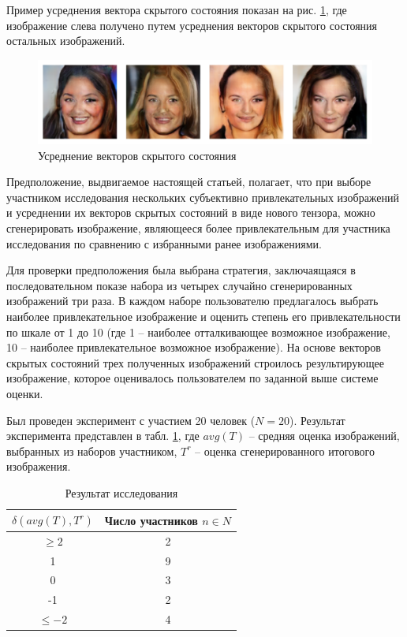 \documentclass[60x84/16,8pt]{ittmm}
\begin{document}
Пример усреднения вектора скрытого состояния показан на рис. \ref{fig:interpolation}, где изображение слева
получено путем усреднения векторов скрытого состояния остальных изображений.

\begin{figure}
  \centering
  \includegraphics[width=0.8\linewidth]{interpolation}
  \caption{Усреднение векторов скрытого состояния}
  \label{fig:interpolation}
\end{figure}

Предположение, выдвигаемое настоящей статьей, полагает, что при выборе участником исследования
нескольких субъективно привлекательных изображений и усреднении их векторов скрытых
состояний в виде нового тензора, можно сгенерировать изображение,
являющееся более привлекательным для участника исследования по сравнению с избранными ранее
изображениями.

Для проверки предположения была выбрана стратегия, заключаящаяся в последовательном показе набора из четырех
случайно сгенерированных изображений три раза. В каждом наборе пользователю предлагалось выбрать
наиболее привлекательное изображение и оценить степень его привлекательности по шкале от 1 до 10
(где 1 -- наиболее отталкивающее возможное изображение, 10 -- наиболее привлекательное возможное изображение).
На основе векторов скрытых состояний трех полученных изображений строилось результирующее изображение,
которое оценивалось пользователем по заданной выше системе оценки.

Был проведен эксперимент с участием 20 человек (\(N = 20\)).
Результат эксперимента представлен в табл. \ref{tab:experiment},
где \(avg(T)\) -- средняя оценка изображений, выбранных из наборов участником,
\(T^r\) -- оценка сгенерированного итогового изображения.

\begin{table}
  \centering
  \caption{Результат исследования}
  \label{tab:experiment}
  \begin{tabular}{|c|c|}
    \hline
    \(\delta (avg(T), T^r)\) & Число участников \(n \in N\) \\
    \hline
    \(\ge 2\) & 2 \\
    1         & 9 \\
    0         & 3 \\
    -1        & 2 \\
    \(\le -2\)& 4 \\
    \hline
  \end{tabular}
\end{table}
\end{document}
